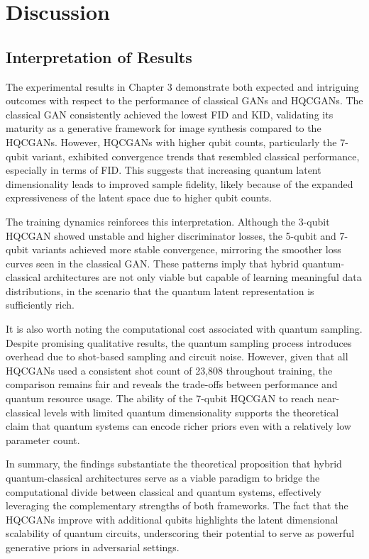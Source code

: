 
\chapter{Discussion}
\label{ch:discussion}
\vspace{2em}

\section{Interpretation of Results}

The experimental results in Chapter 3 demonstrate both expected and intriguing outcomes with respect to the performance of classical GANs and HQCGANs. The classical GAN consistently achieved the lowest FID and KID, validating its maturity as a generative framework for image synthesis compared to the HQCGANs. However, HQCGANs with higher qubit counts, particularly the 7-qubit variant, exhibited convergence trends that resembled classical performance, especially in terms of FID. This suggests that increasing quantum latent dimensionality leads to improved sample fidelity, likely because of the expanded expressiveness of the latent space due to higher qubit counts.

The training dynamics reinforces this interpretation. Although the 3-qubit HQCGAN showed unstable and higher discriminator losses, the 5-qubit and 7-qubit variants achieved more stable convergence, mirroring the smoother loss curves seen in the classical GAN. These patterns imply that hybrid quantum-classical architectures are not only viable but capable of learning meaningful data distributions, in the scenario that the quantum latent representation is sufficiently rich.

It is also worth noting the computational cost associated with quantum sampling. Despite promising qualitative results, the quantum sampling process introduces overhead due to shot-based sampling and circuit noise. However, given that all HQCGANs used a consistent shot count of 23,808 throughout training, the comparison remains fair and reveals the trade-offs between performance and quantum resource usage. The ability of the 7-qubit HQCGAN to reach near-classical levels with limited quantum dimensionality supports the theoretical claim that quantum systems can encode richer priors even with a relatively low parameter count.

In summary, the findings substantiate the theoretical proposition that hybrid quantum-classical architectures serve as a viable paradigm to bridge the computational divide between classical and quantum systems, effectively leveraging the complementary strengths of both frameworks. The fact that the HQCGANs improve with additional qubits highlights the latent dimensional scalability of quantum circuits, underscoring their potential to serve as powerful generative priors in adversarial settings.

